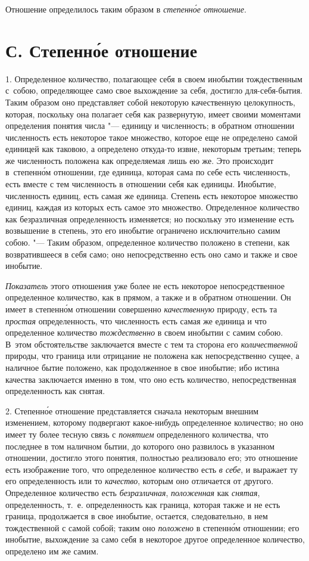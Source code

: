 Отношение определилось таким образом в {\em степенн\'{о}е отношение}.

\section[С. Степенн\'{о}е отношение]{С. Степенн\'{о}е отношение}

1. Определенное количество, полагающее себя в своем инобытии тождественным
с~собою, определяющее само свое выхождение за себя, достигло для-себя-бытия.
Таким образом оно представляет собой некоторую качественную целокупность,
которая, поскольку она полагает себя как развернутую, имеет своими моментами
определения понятия числа "--- единицу и численность; в обратном отношении
численность есть некоторое такое множество, которое еще не определено самой
единицей как таковою, а определено откуда-то извне, некоторым третьим; теперь
же численность положена как определяемая лишь ею же. Это происходит
в~степенн\'{о}м отношении, где единица, которая сама по себе есть численность,
есть вместе с тем численность в отношении себя как единицы. Инобытие,
численность единиц, есть самая же единица. Степень есть некоторое множество
единиц, каждая из которых есть самое это множество. Определенное количество как
безразличная определенность изменяется; но поскольку это изменение есть
возвышение в степень, это его инобытие ограничено исключительно самим собою.
"--- Таким образом, определенное количество положено в степени, как
возвратившееся в себя само; оно непосредственно есть оно само и также
и свое инобытие.

{\em Показатель} этого отношения уже более не есть некоторое непосредственное
определенное количество, как в прямом, а также и в обратном отношении. Он имеет
в степенн\'{о}м отношении совершенно {\em качественную} природу, есть та
{\em простая} определенность, что численность есть самая же единица и что
определенное количество {\em тождественно} в своем инобытии с самим собою.
В~этом обстоятельстве заключается вместе с тем та сторона его
{\em количественной} природы, что граница или отрицание не положена как
непосредственно сущее, а наличное бытие положено, как продолженное в свое
инобытие; ибо истина качества заключается именно в том, что оно есть
количество, непосредственная определенность как снятая.

2. Степенн\'{о}е отношение представляется сначала некоторым внешним изменением,
которому подвергают какое-нибудь определенное количество; но оно имеет ту более
тесную связь с {\em понятием} определенного количества, что последнее в том
наличном бытии, до которого оно развилось в указанном отношении, достигло этого
понятия, полностью реализовало его; это отношение есть изображение того, что
определенное количество есть {\em в себе}, и выражает ту его определенность или
то {\em качество}, которым оно отличается от другого. Определенное количество
есть {\em безразличная}, {\em положенная} как {\em снятая}, определенность,
т.~е. определенность как граница, которая также и не есть граница, продолжается
в свое инобытие, остается, следовательно, в нем тождественной с самой собой;
таким оно {\em положено} в степенн\'{о}м отношении; его инобытие, выхождение за
само себя в некоторое другое определенное количество, определено им же самим.

